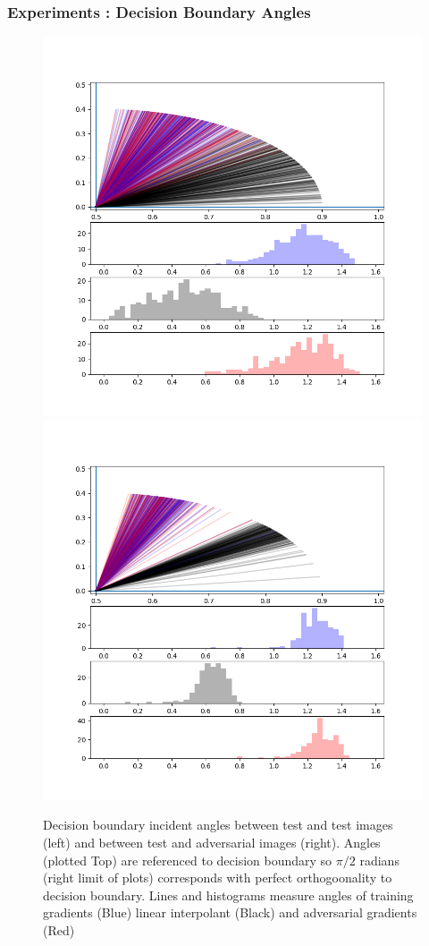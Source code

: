 \begin{frame}
  \frametitle{Experiments : Decision Boundary Angles}

 \begin{figure}[!ht]
 \centering\includegraphics[width=0.50\linewidth, trim=1.5cm 1.5cm 2cm 2cm, clip]{c3_figures/stab-mnist-C32-100-100-10-0.001-200-eval-1e-06-db_interp-angles-1stquadall199.png}\includegraphics[width=0.50\linewidth, trim=1.5cm 1.5cm 2cm 2cm, clip]{c3_figures/stab-mnist-C32-100-100-10-0.001-200-eval-1e-06-attack-db_interp-angles-1stquadall199.png}

 \caption{Decision boundary incident angles between test and test images (left) and between test and adversarial images (right). Angles (plotted Top) are referenced to decision boundary so $\pi/2$ radians (right limit of plots) corresponds with perfect orthogoonality to decision boundary. Lines and histograms measure angles of training gradients (Blue) linear interpolant (Black) and adversarial gradients (Red)}
 \label{fig:dba}
 \end{figure}
\end{frame}


